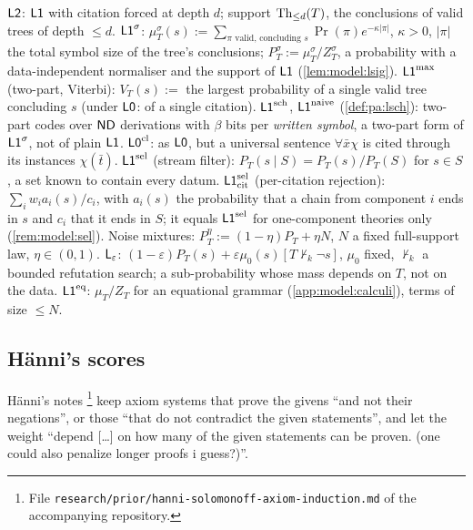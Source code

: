 \begin{definition}[Variants]\label{def:model:variants}
$\mathord{\mathsf{L2}}$: $\mathord{\mathsf{L1}}$ with citation forced at depth $d$; support $\mathrm{Th}_{\le d}(T)$, the conclusions of valid trees of depth $\le d$.
$\mathord{\mathsf{L1}}^{\sigma}$: $\mu^\sigma_T(s):=\sum_{\pi\text{ valid, concluding }s}\Pr(\pi)e^{-\kappa|\pi|}$, $\kappa>0$, $|\pi|$ the total symbol size of the tree's conclusions; $P^\sigma_T:=\mu^\sigma_T/Z^\sigma_T$, a probability with a data-independent normaliser and the support of $\mathord{\mathsf{L1}}$ (\cref{lem:model:lsig}).
$\mathord{\mathsf{L1}}^{\max}$ (two-part, Viterbi): $V_T(s):=$ the largest probability of a single valid tree concluding $s$ (under $\mathord{\mathsf{L0}}$: of a single citation).
$\mathord{\mathsf{L1}}^{\mathrm{sch}}$, $\mathord{\mathsf{L1}}^{\mathrm{naive}}$ (\cref{def:pa:lsch}): two-part codes over $\mathsf{ND}$ derivations with $\beta$ bits per \emph{written symbol}, a two-part form of $\mathord{\mathsf{L1}}^{\sigma}$, not of plain $\mathord{\mathsf{L1}}$.
$\mathord{\mathsf{L0}}^{\mathrm{cl}}$: as $\mathord{\mathsf{L0}}$, but a universal sentence $\forall\bar x\chi$ is cited through its instances $\chi(\bar t)$.
$\mathord{\mathsf{L1}}^{\mathrm{sel}}$ (stream filter): $P_T(s\mid S)=P_T(s)/P_T(S)$ for $s\in S$, a set known to contain every datum.
$\mathord{\mathsf{L1}}^{\mathrm{sel}}_{\mathrm{cit}}$ (per-citation rejection): $\sum_iw_ia_i(s)/c_i$, with $a_i(s)$ the probability that a chain from component $i$ ends in $s$ and $c_i$ that it ends in $S$; it equals $\mathord{\mathsf{L1}}^{\mathrm{sel}}$ for one-component theories only (\cref{rem:model:sel}).
Noise mixtures: $P^\eta_T:=(1-\eta)P_T+\eta N$, $N$ a fixed full-support law, $\eta\in(0,1)$.
$\mathsf{L}_{\varepsilon}$: $(1-\varepsilon)P_T(s)+\varepsilon\mu_0(s)[T\nvdash_k\neg s]$, $\mu_0$ fixed, $\nvdash_k$ a bounded refutation search; a sub-probability whose mass depends on $T$, not on the data.
$\mathord{\mathsf{L1}}^{\mathrm{eq}}$: $\mu_T/Z_T$ for an equational grammar (\cref{app:model:calculi}), terms of size $\le N$.
\end{definition}
\subsection{H\"anni's scores}\label{sec:model:scores}

H\"anni's notes \citep{hanni2026notes}\footnote{File \texttt{research/prior/hanni-solomonoff-axiom-induction.md} of the accompanying repository.} keep axiom systems that prove the givens ``and not their negations'', or those ``that do not contradict the given statements'', and let the weight ``depend [\dots] on how many of the given statements can be proven. (one could also penalize longer proofs i guess?)''.

